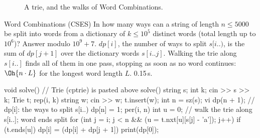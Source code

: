 \begin{figure}[htbp]
\centering
{}
\caption{A trie, and the walks of Word Combinations.}
\label{fig:trie}
\end{figure}


\begin{problem}{Word Combinations (CSES)}
In how many ways can a string of length $n \le 5000$ be split into words from a dictionary of $k \le 10^5$ distinct words (total length
up to $10^6$)? Answer modulo $10^9 + 7$.
\solution $\mathit{dp}[i]$, the number of ways to split $s[i..)$, is the sum of $\mathit{dp}[j + 1]$ over the dictionary words $s[i..j]$.
Walking the trie along $s[i..]$ finds all of them in one pass, stopping as soon as no word continues: $\Oh{n \cdot L}$ for the longest
word length $L$. 0.15\,s.
\end{problem}

\begin{code}
void solve() {  // Trie (cptrie) is pasted above solve()
    string s;
    int k;
    cin >> s >> k;
    Trie t;
    rep(i, k) {
        string w;
        cin >> w;
        t.insert(w);
    }
    int n = sz(s);
    vi dp(n + 1);  // dp[i]: the ways to split s[i..)
    dp[n] = 1;
    per(i, n) {
        int u = 0;  // walk the trie along s[i..]; word ends split
        for (int j = i; j < n && (u = t.nxt[u][s[j] - 'a']); j++)
            if (t.ends[u]) dp[i] = (dp[i] + dp[j + 1]) %
    }
    print(dp[0]);
}
\end{code}

